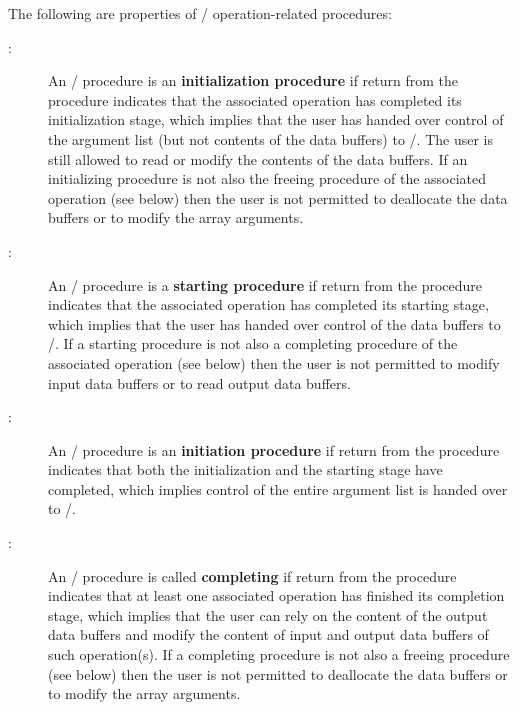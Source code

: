 \medskip %

The following are properties of \MPI/ operation-related procedures:
\begin{description}
\item[:]
An \MPI/ procedure is an \textbf{initialization procedure} if return from the
procedure indicates that the associated operation has completed its
initialization stage, which implies that the user has handed over
control of the argument list (but not contents of the data buffers) to
\MPI/.
The user is still allowed to read or modify the contents of the data buffers.
If an initializing procedure is not also the freeing procedure of the associated
operation (see below) then the user is not permitted to deallocate
the data buffers or to modify the array arguments.

\item[:]
An \MPI/ procedure is a \textbf{starting procedure} if return from the
procedure indicates that the associated operation has completed its
starting stage, which implies that the user has handed over control of
the data buffers to \MPI/.
If a starting procedure is not also a completing procedure of the
associated operation (see below) then the user is not permitted to
modify input data buffers or to read output data buffers.

\item[:]
An \MPI/ procedure is an \textbf{initiation procedure} if return from the
procedure indicates that both the initialization and
the starting stage have completed, which implies
control of the entire argument list is handed over to \MPI/.

\item[:]
An \MPI/ procedure is called \textbf{completing} if return from the
procedure indicates that at least one associated operation has
finished its completion stage, which implies that the user can rely on
the content of the output data buffers and modify the content of input
and output data buffers of such operation(s). If a completing procedure is not also a
freeing procedure (see below) then the user is not permitted to
deallocate the data buffers or to modify the array
arguments.


\end{description}
